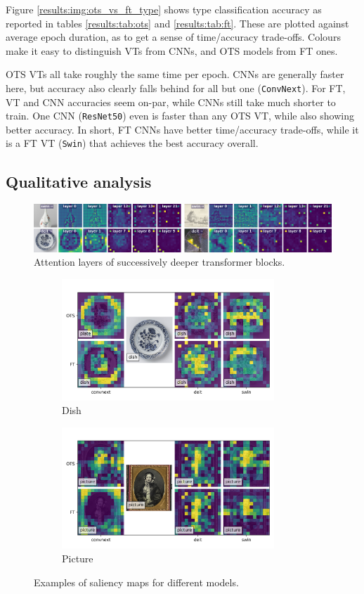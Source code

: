 Figure \ref{results:img:ots_vs_ft_type} shows type classification accuracy as reported in tables \ref{results:tab:ots} and \ref{results:tab:ft}. These are plotted against average epoch duration, as to get a sense of time/accuracy trade-offs. Colours make it easy to distinguish VTs from CNNs, and OTS models from FT ones.

OTS VTs all take roughly the same time per epoch. CNNs are generally faster here, but accuracy also clearly falls behind for all but one (\texttt{ConvNext}). For FT, VT and CNN accuracies seem on-par, while CNNs still take much shorter to train. One CNN (\texttt{ResNet50}) even is faster than any OTS VT, while also showing better accuracy. In short, FT CNNs have better time/accuracy trade-offs, while it is a FT VT (\texttt{Swin}) that achieves the best accuracy overall.

\subsection{Qualitative analysis}

\begin{figure}[tb]
    \includegraphics[width=\textwidth]{img/layers.png}
    \caption{Attention layers of successively deeper transformer blocks.}
    \label{results:img:layers}
\end{figure}

\begin{figure}[tb]
    \centering
    \begin{subfigure}{0.49\textwidth}
    \includegraphics[width=8cm]{img/img005_salience.png}
    \caption{Dish}
    \label{results:img:sal:dish}
    \end{subfigure}
    \begin{subfigure}{0.49\textwidth}
    \includegraphics[width=8cm]{img/img011_salience.png}
    \caption{Picture}
    \label{results:img:sal:dish}
    \end{subfigure}
    \caption{Examples of saliency maps for different models.}
\end{figure}
